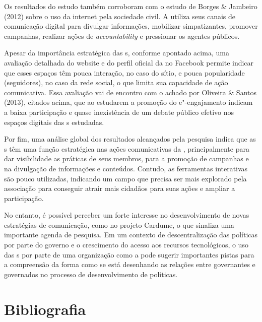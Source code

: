 Os resultados do estudo também corroboram com o estudo de Borges \&
Jambeiro (2012) sobre o uso da internet pela sociedade civil. A 
utiliza seus canais de comunicação digital para divulgar informações,
mobilizar simpatizantes, promover campanhas, realizar ações de
\emph{accountability} e pressionar os agentes públicos.

Apesar da importância estratégica das s, conforme apontado acima, uma
avaliação detalhada do website e do perfil oficial da  no Facebook
permite indicar que esses espaços têm pouca interação, no caso do sítio,
e pouca popularidade (seguidores), no caso da rede social, o que limita
sua capacidade de ação comunicativa. Essa avaliação vai de encontro com
o achado por Oliveira \& Santos (2013), citados acima, que ao estudarem
a promoção do e"-engajamento indicam a baixa participação e quase
inexistência de um debate público efetivo nos espaços digitais das s
estudadas.

Por fim, uma análise global dos resultados alcançados pela pesquisa
indica que as s têm uma função estratégica nas ações comunicativas da
, principalmente para dar visibilidade as práticas de seus membros,
para a promoção de campanhas e na divulgação de informações e conteúdos.
Contudo, as ferramentas interativas são pouco utilizadas, indicando um
campo que precisa ser mais explorado pela associação para conseguir
atrair mais cidadãos para suas ações e ampliar a participação.

No entanto, é possível perceber um forte interesse no desenvolvimento de
novas estratégias de comunicação, como no projeto Cardume, o que
sinaliza uma importante agenda de pesquisa. Em um contexto de
descentralização das políticas por parte do governo e o crescimento do
acesso aos recursos tecnológicos, o uso das s por parte de uma
organização como a  pode sugerir importantes pistas para a
compreensão da forma como se está desenhando as relações entre
governantes e governados no processo de desenvolvimento de políticas.

\section{Bibliografia}

